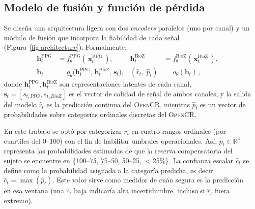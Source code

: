 \documentclass[10pt,a4paper,twocolumn]{article}
\newcommand{\OpenCR}{\textsc{OpenCR}}
\begin{document}
\subsection{Modelo de fusi\'on y funci\'on de p\'erdida}
Se dise\~na una arquitectura ligera con dos \emph{encoders} paralelos (uno por canal) y un m\'odulo de fusi\'on que incorpora la fiabilidad de cada se\~nal (Figura~\ref{fig:architecture}). Formalmente:
\begin{align}
\bm{h}^{\mathrm{PPG}}_t &= f^{\mathrm{PPG}}_{\theta}(\,\bm{x}^{\mathrm{PPG}}_t\,), & 
\bm{h}^{\mathrm{BioZ}}_t &= f^{\mathrm{BioZ}}_{\theta}(\,\bm{x}^{\mathrm{BioZ}}_t\,), \\
\bm{h}_t &= g_{\theta}\!\big(\bm{h}^{\mathrm{PPG}}_t,\,\bm{h}^{\mathrm{BioZ}}_t,\,\bm{s}_t\big), & 
(\hat r_t,\;\hat p_t) &= o_{\theta}(\bm{h}_t)\,,
\end{align}
donde $\bm{h}^{\mathrm{PPG}}_t, \bm{h}^{\mathrm{BioZ}}_t$ son representaciones latentes de cada canal, $\bm{s}_t = [s_{t,PPG}, s_{t,BioZ}]$ es el vector de calidad de se\~nal de ambos canales, y la salida del modelo $\hat r_t$ es la predicci\'on continua del \OpenCR, mientras $\hat p_t$ es un vector de probabilidades sobre categor\'ias ordinales discretas del \OpenCR. 

En este trabajo se opt\'o por categorizar $r_t$ en cuatro rangos ordinales (por cuartiles del 0--100) con el fin de habilitar umbrales operacionales. As\'i, $\hat p_t \in \mathbb{R}^4$ representa las probabilidades estimadas de que la reserva compensatoria del sujeto se encuentre en \{100--75, 75--50, 50--25, $<$25\%\}. La confianza escalar $\hat c_t$ se define como la probabilidad asignada a la categor\'ia predicha, es decir $\hat c_t = \max(\hat p_t)$. Este valor sirve como medidor de cu\'an segura es la predicci\'on en esa ventana (una $\hat c_t$ baja indicar\'ia alta incertidumbre, incluso si $\hat r_t$ fuera extremo).
\end{document}
